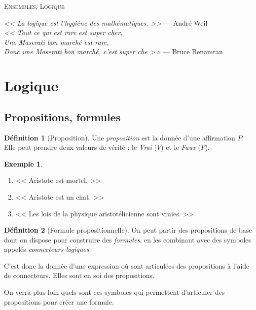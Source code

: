\documentclass[11pt]{article}
\theoremstyle{definition}
\newtheorem{defn}{Définition}[section]
\newtheorem{exe}{Exemple}
\theoremstyle{remark}
\begin{document}
\begin{center}
	\textsc{\LARGE Ensembles, Logique}
\end{center}
\vspace{1cm}

\begin{flushright}
\textit{<< La logique est l'hygiène des mathématiques. >>} — André Weil\\
\textit{<< Tout ce qui est rare est super cher,\\
    Une Maserati bon marché est rare,\\
    Donc une Maserati bon marché, c'est super che >>} — Bruce Benamran
\end{flushright}

\section{Logique}

\subsection{Propositions, formules}

\begin{defn}[Proposition]
Une \textit{proposition} est la donnée d'une affirmation $P$. Elle peut prendre deux valeurs de vérité : le \textit{Vrai} ($V$) et le \textit{Faux} ($F$).
\end{defn}

\begin{exe}\leavevmode
\begin{enumerate}
\item << Aristote est mortel. >>
\item << Aristote est un chat. >>
\item << Les lois de la physique aristotélicienne sont vraies. >>
\end{enumerate}
\end{exe}

\begin{defn}[Formule propositionnelle]
On peut partir des propositions de base dont on dispose pour construire des \textit{formules}, en les combinant avec des symboles appelés \textit{connecteurs logiques}.

C'est donc la donnée d'une expression où sont articulées des propositions à l'aide de connecteurs. Elles sont en soi des propositions.
\end{defn}

On verra plus loin quels sont ces symboles qui permettent d'articuler des propositions pour créer une formule.
\end{document}
